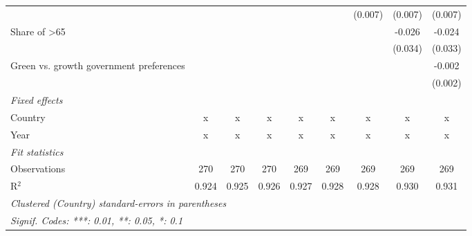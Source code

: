 \begin{table}[htbp]
\begin{tabular}{lcccccccc}
                                                            &         &         &         &         &         & (0.007) & (0.007) & (0.007)\\   
      Share of >65                                          &         &         &         &         &         &         & -0.026  & -0.024\\   
                                                            &         &         &         &         &         &         & (0.034) & (0.033)\\   
      Green vs. growth government preferences               &         &         &         &         &         &         &         & -0.002\\   
                                                            &         &         &         &         &         &         &         & (0.002)\\   
      \emph{Fixed effects}\\
      Country                                               & x       & x       & x       & x       & x       & x       & x       & x\\  
      Year                                                  & x       & x       & x       & x       & x       & x       & x       & x\\  
      \midrule \emph{Fit statistics}\\
      Observations                                          & 270     & 270     & 270     & 269     & 269     & 269     & 269     & 269\\  
      R$^2$                                                 & 0.924   & 0.925   & 0.926   & 0.927   & 0.928   & 0.928   & 0.930   & 0.931\\  
      \midrule
      \multicolumn{9}{l}{\emph{Clustered (Country) standard-errors in parentheses}}\\
      \multicolumn{9}{l}{\emph{Signif. Codes: ***: 0.01, **: 0.05, *: 0.1}}\\
   \end{tabular}
\end{table}


